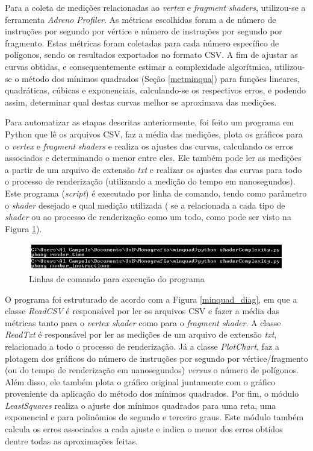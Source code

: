 	Para a coleta de medições relacionadas ao \textit{vertex} e \textit{fragment} \textit{shaders}, utilizou-se a ferramenta \textit{Adreno Profiler}. As métricas escolhidas foram a de número de instruções por segundo por vértice e número de instruções por segundo por fragmento. Estas métricas foram coletadas para cada número específico de polígonos, sendo os resultados exportados no formato CSV. A fim de ajustar as curvas obtidas, e consequentemente estimar a complexidade algorítmica, utilizou-se o método dos mínimos quadrados (Seção \ref{metminqua}) para funções lineares, quadráticas, cúbicas e exponenciais, calculando-se os respectivos erros, e podendo assim, determinar qual destas curvas melhor se aproximava das medições. 

	 Para automatizar as etapas descritas anteriormente, foi feito um programa em Python que lê os arquivos CSV, faz a média das medições, plota os gráficos para o \textit{vertex} e \textit{fragment} \textit{shaders} e realiza os ajustes das curvas, calculando os erros associados e determinando o menor entre eles.  Ele também pode ler as medições a partir de um arquivo de extensão \textit{txt} e realizar os ajustes das curvas para todo o processo de renderização (utilizando a medição do tempo em nanosegundos). Este programa (\textit{script}) é executado por linha de comando, tendo como parâmetro o \textit{shader} desejado e qual medição utilizada ( se a relacionada a cada tipo de \textit{shader} ou ao processo de renderização como um todo, como pode ser visto na Figura \ref{linhacomando}).

	\begin{figure}[ht]
	\centering
		\includegraphics[keepaspectratio=true,scale=0.8]{figuras/linhacomando.jpg}
	\caption{Linhas de comando para execução do programa}
	\label{linhacomando}
	\end{figure}


	O programa foi estruturado de acordo com a Figura \ref{minquad_diag}, em que a classe \textit{ReadCSV} é responsável por ler os arquivos CSV e fazer a média das métricas tanto para o \textit{vertex shader} como para o \textit{fragment shader}. A classe \textit{ReadTxt} é responsável por ler as medições de um arquivo de extensão \textit{txt}, relacionado a todo o processo de renderização. Já a classe \textit{PlotChart}, faz a plotagem dos gráficos do número de instruções por segundo por vértice/fragmento (ou do tempo de renderização em nanosegundos) \textit{versus} o número de polígonos. Além disso, ele também plota o gráfico original juntamente com o gráfico proveniente da aplicação do método dos mínimos quadrados. Por fim, o módulo \textit{LeastSquares} realiza o ajuste dos mínimos quadrados para uma reta, uma exponencial e para polinômios de segundo e terceiro graus. Este módulo também calcula os erros associados a cada ajuste e indica o menor dos erros obtidos dentre todas as aproximações feitas. 

